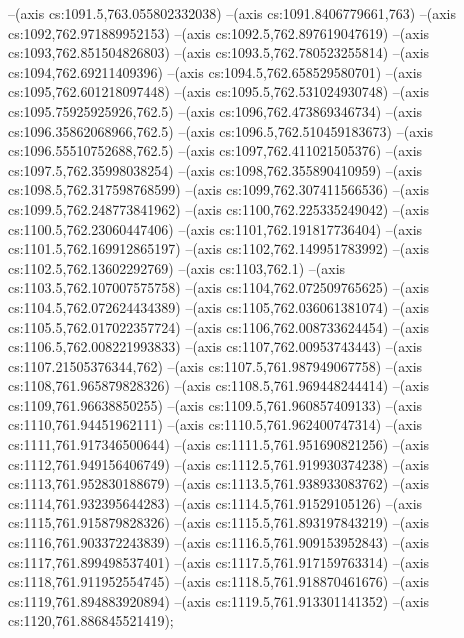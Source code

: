 --(axis cs:1091.5,763.055802332038)
--(axis cs:1091.8406779661,763)
--(axis cs:1092,762.971889952153)
--(axis cs:1092.5,762.897619047619)
--(axis cs:1093,762.851504826803)
--(axis cs:1093.5,762.780523255814)
--(axis cs:1094,762.69211409396)
--(axis cs:1094.5,762.658529580701)
--(axis cs:1095,762.601218097448)
--(axis cs:1095.5,762.531024930748)
--(axis cs:1095.75925925926,762.5)
--(axis cs:1096,762.473869346734)
--(axis cs:1096.35862068966,762.5)
--(axis cs:1096.5,762.510459183673)
--(axis cs:1096.55510752688,762.5)
--(axis cs:1097,762.411021505376)
--(axis cs:1097.5,762.35998038254)
--(axis cs:1098,762.355890410959)
--(axis cs:1098.5,762.317598768599)
--(axis cs:1099,762.307411566536)
--(axis cs:1099.5,762.248773841962)
--(axis cs:1100,762.225335249042)
--(axis cs:1100.5,762.23060447406)
--(axis cs:1101,762.191817736404)
--(axis cs:1101.5,762.169912865197)
--(axis cs:1102,762.149951783992)
--(axis cs:1102.5,762.13602292769)
--(axis cs:1103,762.1)
--(axis cs:1103.5,762.107007575758)
--(axis cs:1104,762.072509765625)
--(axis cs:1104.5,762.072624434389)
--(axis cs:1105,762.036061381074)
--(axis cs:1105.5,762.017022357724)
--(axis cs:1106,762.008733624454)
--(axis cs:1106.5,762.008221993833)
--(axis cs:1107,762.00953743443)
--(axis cs:1107.21505376344,762)
--(axis cs:1107.5,761.987949067758)
--(axis cs:1108,761.965879828326)
--(axis cs:1108.5,761.969448244414)
--(axis cs:1109,761.96638850255)
--(axis cs:1109.5,761.960857409133)
--(axis cs:1110,761.94451962111)
--(axis cs:1110.5,761.962400747314)
--(axis cs:1111,761.917346500644)
--(axis cs:1111.5,761.951690821256)
--(axis cs:1112,761.949156406749)
--(axis cs:1112.5,761.919930374238)
--(axis cs:1113,761.952830188679)
--(axis cs:1113.5,761.938933083762)
--(axis cs:1114,761.932395644283)
--(axis cs:1114.5,761.91529105126)
--(axis cs:1115,761.915879828326)
--(axis cs:1115.5,761.893197843219)
--(axis cs:1116,761.903372243839)
--(axis cs:1116.5,761.909153952843)
--(axis cs:1117,761.899498537401)
--(axis cs:1117.5,761.917159763314)
--(axis cs:1118,761.911952554745)
--(axis cs:1118.5,761.918870461676)
--(axis cs:1119,761.894883920894)
--(axis cs:1119.5,761.913301141352)
--(axis cs:1120,761.886845521419);

